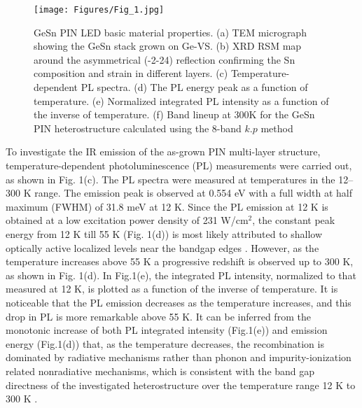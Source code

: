 \bigskip

\begin{figure}[htbp]
\centering
\texttt{[image: Figures/Fig\_1.jpg]}
\caption{GeSn PIN LED basic material properties. (a) TEM micrograph showing the GeSn stack grown on Ge-VS. (b) XRD RSM map around the asymmetrical (-2-24) reflection confirming the Sn composition and strain in different layers. (c) Temperature-dependent PL spectra. (d) The PL energy peak as a function of temperature. (e) Normalized integrated PL intensity as a function of the inverse of temperature. (f) Band lineup at 300K for the GeSn PIN heterostructure calculated using the 8-band $k.p$ method}
\label{fig:Fig__1}
\end{figure}


\bigskip

To investigate the IR emission of the as-grown PIN multi-layer structure, temperature-dependent photoluminescence (PL) measurements were carried out, as shown in  Fig. 1(c). The PL spectra were measured at temperatures in the 12--300 K range. The emission peak is observed at 0.554 eV with a full width at half maximum (FWHM) of 31.8 meV at 12 K. Since the PL emission at 12 K is obtained at a low excitation power density of 231 W/cm$^2$, the constant peak energy from 12 K till 55 K (Fig. 1(d)) is most likely attributed to shallow optically active localized levels near the bandgap edges \cite{assali2021midinfrared}.
However, as the temperature increases above 55 K a progressive redshift is observed up to 300 K, as shown in Fig. 1(d).  In Fig.1(e), the integrated PL intensity, normalized to that measured at 12 K, is plotted as a function of the inverse of temperature. It is noticeable that the PL emission decreases as the temperature increases, and this drop in PL is more remarkable above 55 K. It can be inferred from the monotonic increase of both PL integrated intensity (Fig.1(e)) and emission energy (Fig.1(d)) that, as the temperature decreases, the recombination is dominated by radiative mechanisms rather than phonon and impurity-ionization related nonradiative mechanisms, which is consistent with the band gap directness of the investigated heterostructure over the temperature range 12 K to 300 K \cite{assali2021midinfrared}.



